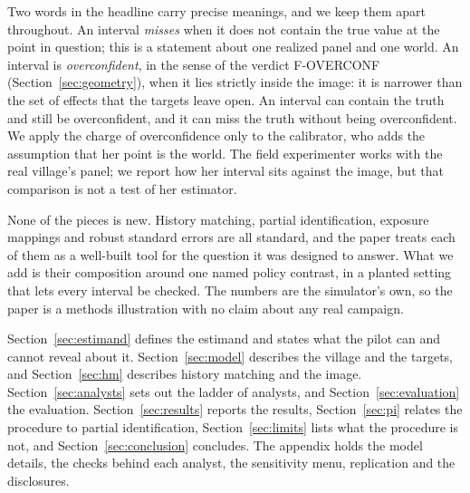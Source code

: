 Two words in the headline carry precise meanings, and we keep them apart
throughout. An interval \emph{misses} when it does not contain the true value at
the point in question; this is a statement about one realized panel and one
world. An interval is \emph{overconfident}, in the sense of the verdict
F-OVERCONF (Section~\ref{sec:geometry}), when it lies strictly inside the image:
it is narrower than the set of effects that the targets leave open. An interval
can contain the truth and still be overconfident, and it can miss the truth
without being overconfident. We apply the charge of overconfidence only to the
calibrator, who adds the assumption that her point is the world. The field
experimenter works with the real village's panel; we report how her interval sits
against the image, but that comparison is not a test of her estimator.

None of the pieces is new. History matching, partial identification, exposure
mappings and robust standard errors are all standard, and the paper treats each
of them as a well-built tool for the question it was designed to answer. What we
add is their composition around one named policy contrast, in a planted setting
that lets every interval be checked. The numbers are the simulator's own, so the
paper is a methods illustration with no claim about any real campaign.

Section~\ref{sec:estimand} defines the estimand and states what the pilot can and
cannot reveal about it. Section~\ref{sec:model} describes the village and the
targets, and Section~\ref{sec:hm} describes history matching and the image.
Section~\ref{sec:analysts} sets out the ladder of analysts, and
Section~\ref{sec:evaluation} the evaluation. Section~\ref{sec:results} reports the
results, Section~\ref{sec:pi} relates the procedure to partial identification,
Section~\ref{sec:limits} lists what the procedure is not, and
Section~\ref{sec:conclusion} concludes. The appendix holds the model details,
the checks behind each analyst, the sensitivity menu, replication and the
disclosures.

